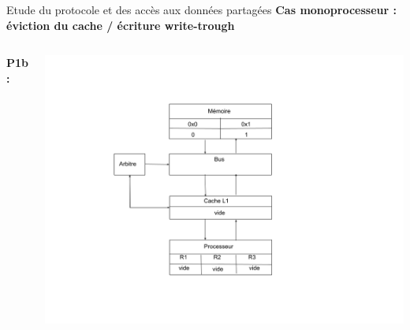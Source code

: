 \documentclass{beamer}
\begin{document}
\begin{frame}{Etude du protocole et des accès aux données partagées}
    \textbf{Cas monoprocesseur : éviction du cache / écriture write-trough}
    \begin{columns}[c] %

        \textbf{P1b : }

        \includegraphics[scale=0.28]{f0.png}
        
    \end{columns}
\end{frame}
\end{document}
